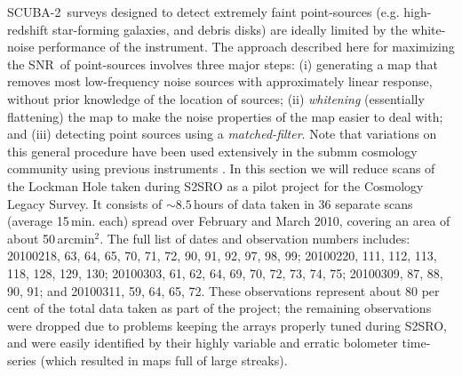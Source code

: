 \documentclass[useAMS,usenatbib,nofootinbib]{mn2e}
\newcommand{\snr}{SNR}
\newcommand{\scuba}{SCUBA-2}
\begin{document}
\scuba\ surveys designed to detect extremely faint point-sources
(e.g. high-redshift star-forming galaxies, and debris disks) are
ideally limited by the white-noise performance of the instrument. The
approach described here for maximizing the \snr\ of point-sources
involves three major steps: (i) generating a map that removes most
low-frequency noise sources with approximately linear response,
without prior knowledge of the location of sources; (ii)
\emph{whitening} (essentially flattening) the map to make the noise
properties of the map easier to deal with; and (iii) detecting point
sources using a \emph{matched-filter}. Note that variations on this
general procedure have been used extensively in the submm cosmology
community using previous instruments
\citep[e.g.][]{scott2002,borys2003,laurent2005,coppin2006,scott2008,perera2008,devlin2009}.
In this section we will reduce scans of the Lockman Hole taken during
S2SRO as a pilot project for the Cosmology Legacy Survey. It consists
of $\sim8.5$\,hours of data taken in 36 separate scans (average
15\,min. each) spread over February and March 2010, covering an area
of about 50\,arcmin$^2$. The full list of dates and observation
numbers includes: 20100218, 63, 64, 65, 70, 71, 72, 90, 91, 92, 97,
98, 99; 20100220, 111, 112, 113, 118, 128, 129, 130; 20100303, 61, 62,
64, 69, 70, 72, 73, 74, 75; 20100309, 87, 88, 90, 91; and 20100311,
59, 64, 65, 72. These observations represent about 80 per cent of the
total data taken as part of the project; the remaining observations
were dropped due to problems keeping the arrays properly tuned during
S2SRO, and were easily identified by their highly variable and erratic
bolometer time-series (which resulted in maps full of large streaks).
\end{document}

